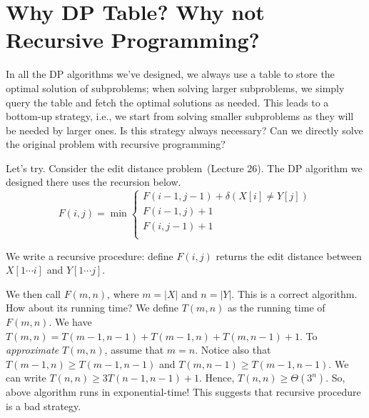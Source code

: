 \setcounter{definition}{0} \setcounter{property}{0} \setcounter{claim}{0} \setcounter{fact}{0} \setcounter{corollary}{0} \setcounter{figure}{0}
\section{Why DP Table? Why not Recursive Programming?}

In all the DP algorithms we've designed, we always use a table to store
the optimal solution of subproblems; when solving larger
subproblems, we simply query the table and fetch the optimal
solutions as needed. 
This leads to a bottom-up strategy, i.e., we start from solving
smaller subproblems as they will be needed by larger ones.
Is this strategy always necessary?
Can we directly solve the original problem with recursive programming?

Let's try.
Consider the edit distance problem~(Lecture 26).
The DP algorithm we designed there uses the recursion below.
\begin{displaymath}
F(i,j) = \min\left\{
	\begin{array}{llll}
	F(i-1,j-1) + \delta(X[i] \neq Y[j]) \\
	F(i-1,j) + 1 \\
	F(i,j-1) + 1 \\
	\end{array}
\right.
\end{displaymath}

We write a recursive procedure: define $F(i,j)$
returns the edit distance between $X[1\cdots i]$ and $Y[1\cdots j]$.

\begin{minipage}{0.8\textwidth}
	\xxx
	\xxx
	\xxx
	\xxx
	\xxx
	\xxx
	\xxx
	\xxx
\end{minipage}

We then call $F(m,n)$, where $m=|X|$ and $n=|Y|$.
This is a correct algorithm.
How about its running time?
We define $T(m,n)$ as the running time of $F(m,n)$.
We have $T(m,n) = T(m-1,n-1) + T(m-1,n) + T(m,n-1) + 1$.
To \emph{approximate} $T(m,n)$, assume that $m=n$.
Notice also that $T(m-1,n) \ge T(m-1,n-1)$
and $T(m,n-1) \ge T(m-1,n-1)$.
We can write $T(n,n) \ge 3T(n-1,n-1) + 1$.
Hence, $T(n,n) \ge \Theta(3^n)$.
So, above algorithm runs in exponential-time!
This suggests that recursive procedure is a bad strategy.

